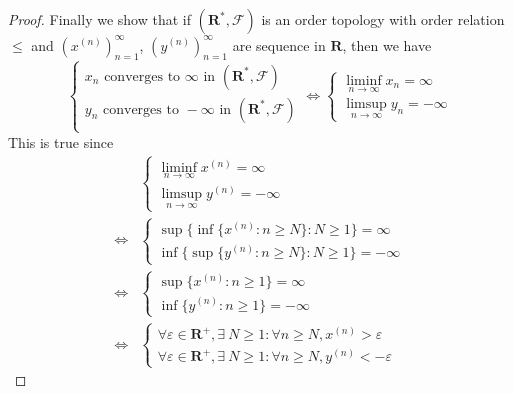 \begin{proof}
    Finally we show that if  \((\mathbf{R}^*, \mathcal{F})\) is an order topology with order relation \(\leq\) and \((x^{(n)})_{n = 1}^\infty\), \((y^{(n)})_{n = 1}^\infty\) are sequence in \(\mathbf{R}\), then we have
    \[
        \begin{cases}
            x_n \text{ converges to } \infty \text{ in } (\mathbf{R}^*, \mathcal{F})  \\
            y_n \text{ converges to } -\infty \text{ in } (\mathbf{R}^*, \mathcal{F}) \\
        \end{cases} \iff \begin{cases}
            \liminf_{n \to \infty} x_n = \infty \\
            \limsup_{n \to \infty} y_n = -\infty
        \end{cases}
    \]
    This is true since
    \begin{align*}
             & \begin{cases}
                   \liminf_{n \to \infty} x^{(n)} = \infty \\
                   \limsup_{n \to \infty} y^{(n)} = -\infty
               \end{cases}                                                                                                            \\
        \iff & \begin{cases}
                   \sup\big\{\inf\{x^{(n)} : n \geq N\} : N \geq 1\big\} = \infty \\
                   \inf\big\{\sup\{y^{(n)} : n \geq N\} : N \geq 1\big\} = -\infty
               \end{cases}                                                                                     \\
        \iff & \begin{cases}
                   \sup\{x^{(n)} : n \geq 1\} = \infty \\
                   \inf\{y^{(n)} : n \geq 1\} = -\infty
               \end{cases}                                                                                                                \\
        \iff & \begin{cases}
                   \forall \varepsilon \in \mathbf{R}^+, \exists\ N \geq 1 : \forall n \geq N, x^{(n)} > \varepsilon \\
                   \forall \varepsilon \in \mathbf{R}^+, \exists\ N \geq 1 : \forall n \geq N, y^{(n)} < -\varepsilon

\end{cases}
\end{align*}
\end{proof}

